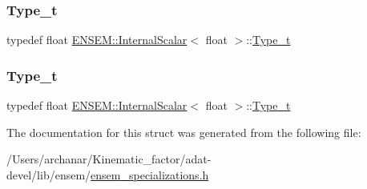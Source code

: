 \mbox{\label{structENSEM_1_1InternalScalar_3_01float_01_4_a0302b6aa9102572c13ac0b2874a380f0}} 
\subsubsection{\texorpdfstring{Type\_t}{Type\_t}\hspace{0.1cm}{\footnotesize\ttfamily [2/3]}}
{\footnotesize\ttfamily typedef float \mbox{\hyperlink{structENSEM_1_1InternalScalar}{E\+N\+S\+E\+M\+::\+Internal\+Scalar}}$<$ float $>$\+::\mbox{\hyperlink{structENSEM_1_1InternalScalar_3_01float_01_4_a0302b6aa9102572c13ac0b2874a380f0}{Type\+\_\+t}}}

\mbox{\label{structENSEM_1_1InternalScalar_3_01float_01_4_a0302b6aa9102572c13ac0b2874a380f0}} 
\subsubsection{\texorpdfstring{Type\_t}{Type\_t}\hspace{0.1cm}{\footnotesize\ttfamily [3/3]}}
{\footnotesize\ttfamily typedef float \mbox{\hyperlink{structENSEM_1_1InternalScalar}{E\+N\+S\+E\+M\+::\+Internal\+Scalar}}$<$ float $>$\+::\mbox{\hyperlink{structENSEM_1_1InternalScalar_3_01float_01_4_a0302b6aa9102572c13ac0b2874a380f0}{Type\+\_\+t}}}



The documentation for this struct was generated from the following file\+:\begin{DoxyCompactItemize}
\item 
/\+Users/archanar/\+Kinematic\+\_\+factor/adat-\/devel/lib/ensem/\mbox{\hyperlink{adat-devel_2lib_2ensem_2ensem__specializations_8h}{ensem\+\_\+specializations.\+h}}\end{DoxyCompactItemize}
